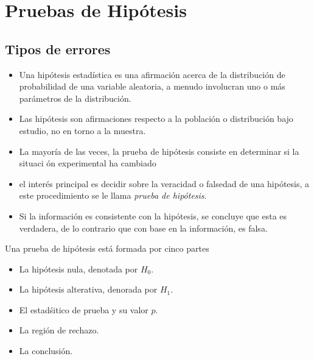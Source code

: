 
\section{Pruebas de Hip\'otesis}
\subsection{Tipos de errores}






\begin{itemize}
\item Una hip\'otesis estad\'istica es una afirmaci\'on  acerca de la distribuci\'on de probabilidad de una variable aleatoria, a menudo involucran uno o m\'as par\'ametros de la distribuci\'on.

\item Las hip\'otesis son afirmaciones respecto a la poblaci\'on o distribuci\'on bajo estudio, no en torno a la muestra.

\item La mayor\'ia de las veces, la prueba de hip\'otesis consiste en determinar si la situaci \'on experimental ha cambiado

\item el inter\'es principal es decidir sobre la veracidad o falsedad de una hip\'otesis, a este procedimiento se le llama \textit{prueba de hip\'otesis}.

\item Si la informaci\'on es consistente con la hip\'otesis, se concluye que esta es verdadera, de lo contrario que con base en la informaci\'on, es falsa.

\end{itemize}







Una prueba de hip\'otesis est\'a formada por cinco partes
\begin{itemize}
\item La hip\'otesis nula, denotada por $H_{0}$.
\item La hip\'otesis alterativa, denorada por $H_{1}$.
\item El estad\'sitico de prueba y su valor $p$.
\item La regi\'on de rechazo.
\item La conclusi\'on.

\end{itemize}

